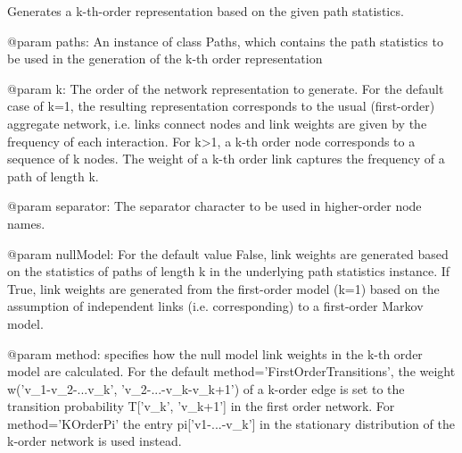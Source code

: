 \begin{DoxyVerb}Generates a k-th-order representation based on the given path statistics.

@param paths: An instance of class Paths, which contains the path statistics to be 
    used in the generation of the k-th order representation 

@param k: The order of the network representation to generate. For the default case of 
    k=1, the resulting representation corresponds to the usual (first-order) aggregate network, 
    i.e. links connect nodes and link weights are given by the frequency of each interaction. For 
    k>1, a k-th order node corresponds to a sequence of k nodes. The weight of a k-th order link 
    captures the frequency of a path of length k.

@param separator: The separator character to be used in higher-order node names.

@param nullModel: For the default value False, link weights are generated based on the statistics of 
    paths of length k in the underlying path statistics instance. If True, link weights are generated 
    from the first-order model (k=1) based on the assumption of independent links (i.e. corresponding) 
    to a first-order Markov model.

@param method: specifies how the null model link weights in the k-th order model are calculated. 
    For the default method='FirstOrderTransitions', the weight w('v_1-v_2-...v_k', 'v_2-...-v_k-v_k+1') of 
    a k-order edge is set to the transition probability T['v_k', 'v_k+1'] in the first order network.
    For method='KOrderPi' the entry pi['v1-...-v_k'] in the stationary distribution of the 
    k-order network is used instead.
\end{DoxyVerb}
 

